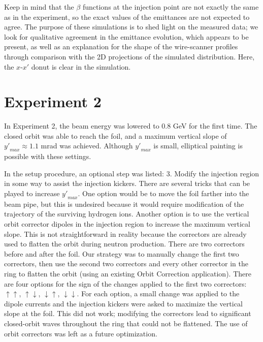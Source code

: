 %
Keep in mind that the $\beta$ functions at the injection point are not exactly the same as in the experiment, so the exact values of the emittances are not expected to agree. The purpose of these simulations is to shed light on the measured data; we look for qualitative agreement in the emittance evolution, which appears to be present, as well as an explanation for the shape of the wire-scanner profiles through comparison with the 2D projections of the simulated distribution. Here, the $x$-$x'$ donut is clear in the simulation.


\section{Experiment 2}

In Experiment 2, the beam energy was lowered to 0.8 GeV for the first time. The closed orbit was able to reach the foil, and a maximum vertical slope of ${y'}_{max} \approx 1.1$ mrad was achieved. Although ${y'}_{max}$ is small, elliptical painting is possible with these settings. 

In the setup procedure, an optional step was listed: 3. Modify the injection region in some way to assist the injection kickers. There are several tricks that can be played to increase ${y'}_{max}$. One option would be to move the foil farther into the beam pipe, but this is undesired because it would require modification of the trajectory of the surviving hydrogen ions. Another option is to use the vertical orbit corrector dipoles in the injection region to increase the maximum vertical slope. This is not straightforward in reality because the correctors are already used to flatten the orbit during neutron production. There are two correctors before and after the foil. Our strategy was to manually change the first two correctors, then use the second two correctors and every other corrector in the ring to flatten the orbit (using an existing Orbit Correction application). There are four options for the sign of the changes applied to the first two correctors: $\uparrow\uparrow$, $\uparrow\downarrow$, $\downarrow\uparrow$, $\downarrow\downarrow$. For each option, a small change was applied to the dipole currents and the injection kickers were asked to maximize the vertical slope at the foil. This did not work; modifying the correctors lead to significant closed-orbit waves throughout the ring that could not be flattened. The use of orbit correctors was left as a future optimization. 

